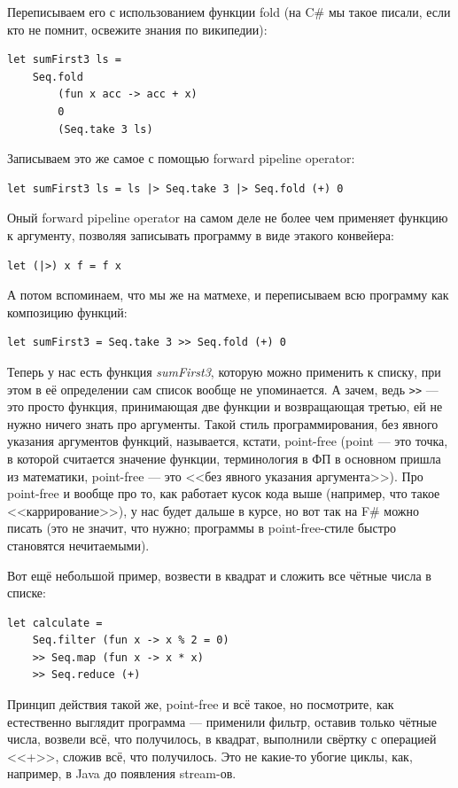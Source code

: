 \documentclass[a5paper]{article}
\begin{document}
Переписываем его с использованием функции fold (на C\# мы такое писали, если кто не помнит, освежите знания по википедии):

\begin{verbatim}
let sumFirst3 ls = 
    Seq.fold 
        (fun x acc -> acc + x) 
        0 
        (Seq.take 3 ls)
\end{verbatim}

Записываем это же самое с помощью forward pipeline operator:
\begin{verbatim}
let sumFirst3 ls = ls |> Seq.take 3 |> Seq.fold (+) 0
\end{verbatim}

Оный  forward pipeline operator на самом деле не более чем применяет функцию к аргументу, позволяя записывать программу в виде этакого конвейера:
\begin{verbatim}
let (|>) x f = f x
\end{verbatim}

А потом вспоминаем, что мы же на матмехе, и переписываем всю программу как композицию функций:
\begin{verbatim}
let sumFirst3 = Seq.take 3 >> Seq.fold (+) 0
\end{verbatim}

Теперь у нас есть функция \textit{sumFirst3}, которую можно применить к списку, при этом в её определении сам список вообще не упоминается. А зачем, ведь \verb|>>| --- это просто функция, принимающая две функции и возвращающая третью, ей не нужно ничего знать про аргументы. Такой стиль программирования, без явного указания аргументов функций, называется, кстати, point-free (point --- это точка, в которой считается значение функции, терминология в ФП в основном пришла из математики, point-free --- это <<без явного указания аргумента>>). Про point-free и вообще про то, как работает кусок кода выше (например, что такое <<каррирование>>), у нас будет дальше в курсе, но вот так на F\# можно писать (это не значит, что нужно; программы в point-free-стиле быстро становятся нечитаемыми).

Вот ещё небольшой пример, возвести в квадрат и сложить все чётные числа в списке:
\begin{verbatim}
let calculate = 
    Seq.filter (fun x -> x % 2 = 0) 
    >> Seq.map (fun x -> x * x) 
    >> Seq.reduce (+)
\end{verbatim}

Принцип действия такой же, point-free и всё такое, но посмотрите, как естественно выглядит программа --- применили фильтр, оставив только чётные числа, возвели всё, что получилось, в квадрат, выполнили свёртку с операцией <<+>>, сложив всё, что получилось. Это не какие-то убогие циклы, как, например, в Java до появления stream-ов.
\end{document}
